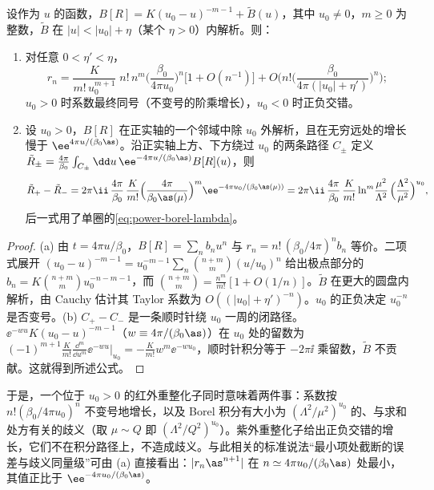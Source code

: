 \begin{lemma}\label{lem:power-borel-pole}
设作为 $u$ 的函数，$B[R]=K(u_0-u)^{-m-1}+\tilde B(u)$，其中 $u_0\ne0$，$m\ge0$ 为整数，$\tilde B$ 在 $|u|<|u_0|+\eta$（某个 $\eta>0$）内解析。则：
\begin{enumerate}[label=(\alph*),leftmargin=2em,itemsep=1pt,topsep=2pt]
\item 对任意 $0<\eta'<\eta$，
\begin{equation*}
r_n=\frac{K}{m!\,u_0^{m+1}}\;n!\,n^m\Big(\frac{\beta_0}{4\pi u_0}\Big)^n\big[1+O(n^{-1})\big]+O\Big(n!\Big(\frac{\beta_0}{4\pi(|u_0|+\eta')}\Big)^n\Big);
\end{equation*}
$u_0>0$ 时系数最终同号（不变号的阶乘增长），$u_0<0$ 时正负交错。
\item 设 $u_0>0$，$B[R]$ 在正实轴的一个邻域中除 $u_0$ 外解析，且在无穷远处的增长慢于 $\ee^{4\pi u/(\beta_0\as)}$。沿正实轴上方、下方绕过 $u_0$ 的两条路径 $C_\pm$ 定义 $\tilde R_\pm=\frac{4\pi}{\beta_0}\int_{C_\pm}\dd u\,\ee^{-4\pi u/(\beta_0\as)}B[R](u)$，则
\begin{equation*}
\tilde R_+-\tilde R_-=2\pi\ii\,\frac{4\pi}{\beta_0}\,\frac{K}{m!}\Big(\frac{4\pi}{\beta_0\as(\mu)}\Big)^m\ee^{-4\pi u_0/(\beta_0\as(\mu))}
=2\pi\ii\,\frac{4\pi}{\beta_0}\,\frac{K}{m!}\ln^m\!\frac{\mu^2}{\Lambda^2}\,\Big(\frac{\Lambda^2}{\mu^2}\Big)^{u_0},
\end{equation*}
后一式用了单圈的\eqref{eq:power-borel-lambda}。
\end{enumerate}
\end{lemma}

\begin{proof}
(a) 由 $t=4\pi u/\beta_0$，$B[R]=\sum_nb_nu^n$ 与 $r_n=n!\,(\beta_0/4\pi)^nb_n$ 等价。二项式展开 $(u_0-u)^{-m-1}=u_0^{-m-1}\sum_n\binom{n+m}{m}(u/u_0)^n$ 给出极点部分的 $b_n=K\binom{n+m}{m}u_0^{-n-m-1}$，而 $\binom{n+m}{m}=\frac{n^m}{m!}[1+O(1/n)]$。$\tilde B$ 在更大的圆盘内解析，由 Cauchy 估计其 Taylor 系数为 $O((|u_0|+\eta')^{-n})$。$u_0$ 的正负决定 $u_0^{-n}$ 是否变号。(b) $C_+-C_-$ 是一条顺时针绕 $u_0$ 一周的闭路径。$\ee^{-wu}K(u_0-u)^{-m-1}$（$w\equiv4\pi/(\beta_0\as)$）在 $u_0$ 处的留数为 $(-1)^{m+1}\frac{K}{m!}\frac{\dd^m}{\dd u^m}\ee^{-wu}\big|_{u_0}=-\frac{K}{m!}w^m\ee^{-wu_0}$，顺时针积分等于 $-2\pi\ii$ 乘留数，$\tilde B$ 不贡献。这就得到所述公式。
\end{proof}

于是，一个位于 $u_0>0$ 的红外重整化子同时意味着两件事：系数按 $n!(\beta_0/4\pi u_0)^n$ 不变号地增长，以及 Borel 积分有大小为 $(\Lambda^2/\mu^2)^{u_0}$ 的、与求和处方有关的歧义（取 $\mu\sim Q$ 即 $(\Lambda^2/Q^2)^{u_0}$）。紫外重整化子给出正负交错的增长，它们不在积分路径上，不造成歧义。与此相关的标准说法“最小项处截断的误差与歧义同量级”可由 (a) 直接看出：$|r_n\as^{n+1}|$ 在 $n\simeq4\pi u_0/(\beta_0\as)$ 处最小，其值正比于 $\ee^{-4\pi u_0/(\beta_0\as)}$。

